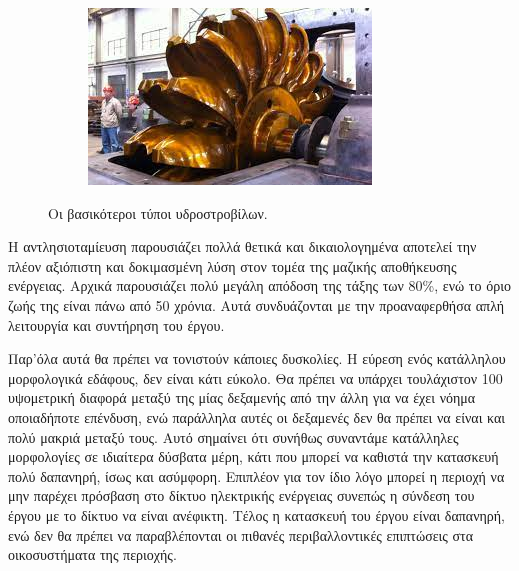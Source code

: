 \documentclass[12pt]{report}
\begin{document}
\begin{figure}[b]
\begin{subfigure}[b]{0.3\textwidth}
         \caption{{}}
         \label{fig:francis}
     \end{subfigure}
     \hfill
     \begin{subfigure}[b]{0.3\textwidth}
         \centering
         \includegraphics[width=\textwidth]{pelton}
         \caption{{}}
         \label{fig:pelton}
     \end{subfigure}
        \caption{Οι βασικότεροι τύποι υδροστροβίλων.}
				\captionsetup{name=Εικόνα}
        \label{fig:hydro-turbines}
\end{figure}

Η αντλησιοταμίευση παρουσιάζει πολλά θετικά και δικαιολογημένα αποτελεί την πλέον αξιόπιστη και δοκιμασμένη λύση στον τομέα της μαζικής αποθήκευσης ενέργειας. Αρχικά παρουσιάζει πολύ μεγάλη απόδοση της τάξης των 80\%, 
ενώ το όριο ζωής της είναι πάνω από 50 χρόνια. Αυτά συνδυάζονται με την προαναφερθήσα απλή λειτουργία και συντήρηση του έργου.

Παρ'όλα αυτά θα πρέπει να τονιστούν κάποιες δυσκολίες. Η εύρεση ενός κατάλληλου μορφολογικά εδάφους, δεν είναι κάτι εύκολο. Θα πρέπει να υπάρχει τουλάχιστον 100{} υψομετρική διαφορά μεταξύ της μίας δεξαμενής 
από την άλλη για να έχει νόημα οποιαδήποτε επένδυση, ενώ παράλληλα αυτές οι δεξαμενές δεν θα πρέπει να είναι και πολύ μακριά μεταξύ τους. Αυτό σημαίνει ότι συνήθως συναντάμε κατάλληλες μορφολογίες σε ιδιαίτερα δύσβατα μέρη, 
κάτι που μπορεί να καθιστά την κατασκευή πολύ δαπανηρή, ίσως και ασύμφορη. Επιπλέον για τον ίδιο λόγο μπορεί η περιοχή να μην παρέχει πρόσβαση στο δίκτυο ηλεκτρικής ενέργειας συνεπώς η σύνδεση του έργου με το δίκτυο να είναι 
ανέφικτη. Τέλος η κατασκευή του έργου είναι δαπανηρή, ενώ δεν θα πρέπει να παραβλέπονται οι πιθανές περιβαλλοντικές επιπτώσεις στα οικοσυστήματα της περιοχής.
\end{document}
